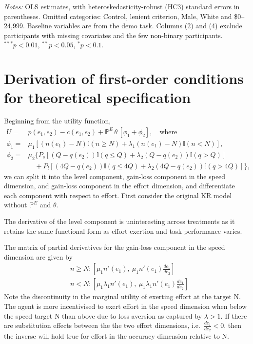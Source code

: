 \documentclass[12pt, letterpaper]{article}
\begin{document}
\begin{table}[p]
\centering
\caption{Treatment effects on sets completed (class sample)}\label{tab:reg-sets-class}
\begin{threeparttable}
\scriptsize\renewcommand{\arraystretch}{0.85}

\begin{tablenotes}[flushleft]
\scriptsize
\item \textit{Notes:} OLS estimates, with heteroskedasticity-robust (HC3) standard errors in parentheses. Omitted categories: Control, lenient criterion, Male, White and \$0--24,999. Baseline variables are from the demo task. Columns (2) and (4) exclude participants with missing covariates and the few non-binary participants. $^{***}p<0.01$, $^{**}p<0.05$, $^{*}p<0.1$.
\end{tablenotes}
\end{threeparttable}
\end{table}

\section{Derivation of first-order conditions for theoretical specification}\label{app:derivation}

Beginning from the utility function,
\[
\begin{aligned}
U = {} & p(e_1, e_2) - c(e_1, e_2) + \mathbb{P}^E \, \theta \, [\phi_1 + \phi_2], \quad \text{where} \\
\phi_1 = {} & \mu_1[(n(e_1)-N)\mathbb{I}(n \geq N) + \lambda_1(n(e_1)-N)\mathbb{I}(n<N)], \\
\phi_2 = {} & \mu_2 \bigl\{P_s[(Q-q(e_2))\mathbb{I}(q \leq Q) + \lambda_2(Q-q(e_2))\mathbb{I}(q>Q)] \\
& \quad + P_l[(4Q-q(e_2))\mathbb{I}(q \leq 4Q) + \lambda_2(4Q-q(e_2))\mathbb{I}(q>4Q)]\bigr\},
\end{aligned}
\]
we can split it into the level component, gain-loss component in the speed dimension, and gain-loss component in the effort dimension, and differentiate each component with respect to effort. First consider the original KR model without $\mathbb{P}^E$ and $\theta$.

The derivative of the level component is uninteresting across treatments as it retains the same functional form as effort exertion and task performance varies.

The matrix of partial derivatives for the gain-loss component in the speed dimension are given by
\[
\begin{aligned}
& n \geq N: [\mu_1 n'(e_1), \: \mu_1 n'(e_1) \frac {de_1}{de_2}] \\
& n < N: [\mu_1 \lambda_1 n'(e_1), \: \mu_1 \lambda_1 n'(e_1) \frac {de_1}{de_2}]
\end{aligned}
\]
Note the discontinuity in the marginal utility of exerting effort at the target N. The agent is more incentivised to exert effort in the speed dimension when below the speed target N than above due to loss aversion as captured by $\lambda>1$. If there are substitution effects between the the two effort dimensions, i.e.~$\frac {de_1}{de_2}<0$, then the inverse will hold true for effort in the accuracy dimension relative to N.
\end{document}
